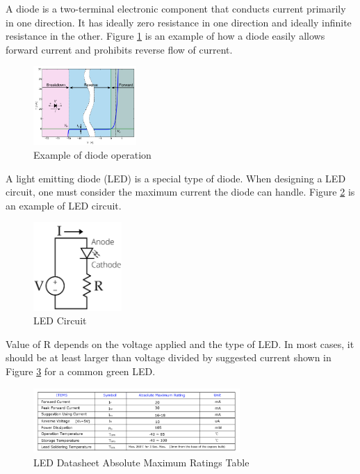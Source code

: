 \documentclass{article}
\begin{document}
A diode is a two-terminal electronic component that conducts current primarily in one direction. It has ideally zero resistance in one direction and ideally infinite resistance in the other. Figure \ref{fig:diodeop} is an example of how a diode easily allows forward current and prohibits reverse flow of current. 

\begin{figure}[!h]
	\center
	\includegraphics[width=0.35\textwidth, keepaspectratio]{diodeop}
	\caption{Example of diode operation}
	\label{fig:diodeop}
\end{figure}

A light emitting diode (LED) is a special type of diode. When designing a LED circuit, one must consider the maximum current the diode can handle. Figure \ref{fig:LEDcct} is an example of LED circuit. 

\begin{figure}[!h]
	\center
	\includegraphics[width=0.3\textwidth, keepaspectratio]{LEDcct}
	\caption{LED Circuit}
	\label{fig:LEDcct}
\end{figure}

Value of R depends on the voltage applied and the type of LED. In most cases, it should be at least larger than voltage divided by suggested current shown in Figure \ref{fig:LEDds} for a common green LED. 

\begin{figure}[!h]
	\center
	\includegraphics[width=0.7\textwidth, keepaspectratio]{LEDds}
	\caption{LED Datasheet Absolute Maximum Ratings Table}
	\label{fig:LEDds}
\end{figure}
\end{document}
